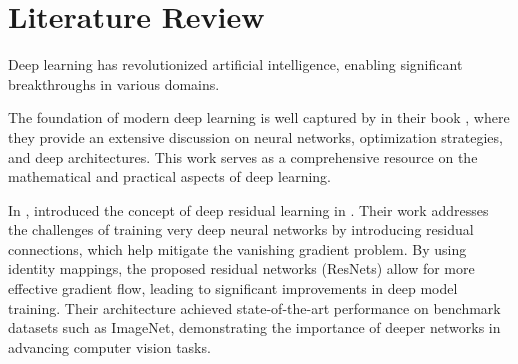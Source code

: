 \chapter{Literature Review }

Deep learning has revolutionized artificial intelligence, enabling significant breakthroughs in various domains. 

The foundation of modern deep learning is well captured by \citeauthor{goodfellow2016deep} in their book \cite{goodfellow2016deep}, where they provide an extensive discussion on neural networks, optimization strategies, and deep architectures. This work serves as a comprehensive resource on the mathematical and practical aspects of deep learning.


In \citeyear{he2016deep}, \citeauthor{he2016deep} introduced the concept of deep residual learning in \cite{he2016deep}. Their work addresses the challenges of training very deep neural networks by introducing residual connections, which help mitigate the vanishing gradient problem. By using identity mappings, the proposed residual networks (ResNets) allow for more effective gradient flow, leading to significant improvements in deep model training. Their architecture achieved state-of-the-art performance on benchmark datasets such as ImageNet, demonstrating the importance of deeper networks in advancing computer vision tasks.


